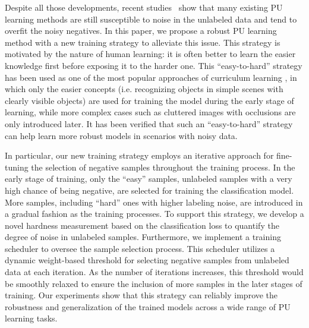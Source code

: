 \documentclass[sigconf]{acmart}
\begin{document}
Despite all those developments, recent studies~\cite{xu2019revisiting} show that many existing PU learning methods are still susceptible to noise in the unlabeled data and tend to overfit the noisy negatives. In this paper, we propose a robust PU learning method with a new training strategy to alleviate this issue. This strategy is motivated by the nature of human learning: it is often better to learn the easier knowledge first before exposing it to the harder one. This ``easy-to-hard'' strategy has been used as one of the most popular approaches of curriculum learning \cite{wang2021survey}, in which only the easier concepts (i.e. recognizing objects in simple scenes with clearly visible objects) are used for training the model during the early stage of learning, while more complex cases such as cluttered images with occlusions are only introduced later. It has been verified that such an ``easy-to-hard'' strategy can help learn more robust models in scenarios with noisy data.

In particular, our new training strategy employs an iterative approach for fine-tuning the selection of negative samples throughout the training process. In the early stage of training, only the ``easy'' samples, unlabeled samples with a very high chance of being negative, are selected for training the classification model. More samples, including ``hard'' ones with higher labeling noise, are introduced in a gradual fashion as the training processes. To support this strategy, we develop a novel hardness measurement based on the classification loss to quantify the degree of noise in unlabeled samples. Furthermore, we implement a training scheduler to oversee the sample selection process. This scheduler utilizes a dynamic weight-based threshold for selecting negative samples from unlabeled data at each iteration. As the number of iterations increases, this threshold would be smoothly relaxed to ensure the inclusion of more samples in the later stages of training. Our experiments show that this strategy can reliably improve the robustness and generalization of the trained models across a wide range of PU learning tasks.   

\end{document}
